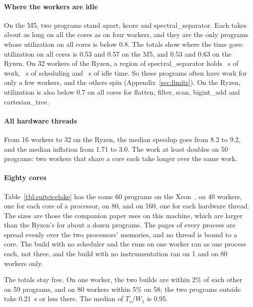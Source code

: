 \documentclass[sigplan,nonacm]{acmart}
\begin{document}
\paragraph{Where the workers are idle}
%
On the M5, two programs stand apart, kcore and spectral\_separator.
%
Each takes about as long on all the cores as on four workers, and
they are the only programs whose utilization on all cores is below
0.8.
%
The totals show where the time goes: utilization on all cores is 0.53
and 0.57 on the M5, and 0.53 and 0.63 on the Ryzen.
%
On 32 workers of the Ryzen, a region of spectral\_separator holds
~s of work,
~s of scheduling and
~s of idle time.
%
So these programs often have work for only a few workers, and the
others spin (Appendix~\ref{sec:limits}).
%
On the Ryzen, utilization is also below 0.7 on all cores for flatten,
filter, scan, bigint\_add and cartesian\_tree.

\paragraph{All hardware threads}
%
From 16 workers to 32 on the Ryzen, the median speedup goes from 8.2
to 9.2, and the median inflation from 1.71 to 3.0.
%
The work at least doubles on 50 programs: two workers that share a
core each take longer over the same work.

\paragraph{Eighty cores}
%
Table~\ref{tbl:suiteicelake} has the same 60 programs on the
Xeon~\cite{flexibench-suiteicelake}, on 40 workers, one for each core
of a processor, on 80, and on 160, one for each hardware thread.
%
The sizes are those the companion paper uses on this machine, which
are larger than the Ryzen's for about a dozen programs.
%
The pages of every process are spread evenly over the two processors'
memories, and no thread is bound to a core.
%
The build with no scheduler and the runs on one worker ran as one
process each, not three, and the build with no instrumentation ran on
1 and on 80 workers only.

The totals stay free.
%
On one worker, the two builds are within 2\% of each other on 59
programs, and on 80 workers within 5\% on 58; the two programs outside
take 0.21~s or less there.
%
The median of $T_s/W_1$ is 0.95.
\end{document}
